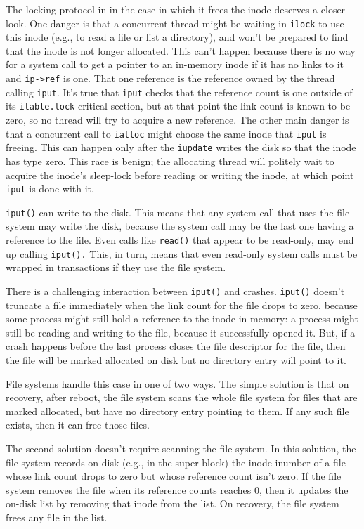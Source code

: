 The locking protocol in 
in the case in which it frees the inode deserves a closer look.
One danger is that a concurrent thread might be waiting in
\lstinline{ilock}
to use this inode (e.g., to read a file or list a directory),
and won't be prepared to find that the inode is not longer
allocated. This can't happen because there is no way for
a system call to get a pointer to an in-memory inode if it has
no links to it and 
\lstinline{ip->ref}
is one. That one reference is the reference owned by the
thread calling
\lstinline{iput}.
It's true that 
\lstinline{iput}
checks that the reference count is one outside of its
\lstinline{itable.lock}
critical section, but at that point the link
count is known to be zero, so no thread will try
to acquire a new reference.
The other main danger is that a concurrent call to
\lstinline{ialloc}
might choose the same inode that
\lstinline{iput}
is freeing.
This can happen only after the
\lstinline{iupdate}
writes the disk so that the inode has type zero.
This race is benign; the allocating thread will politely wait
to acquire the inode's sleep-lock before reading or writing
the inode, at which point
\lstinline{iput}
is done with it.

\lstinline{iput()}
can write to the disk.  This means that any system call that uses the file
system may write the disk, because the system call may be the last one having a
reference to the file. Even calls like
\lstinline{read()}
that appear to be read-only, may end up calling
\lstinline{iput().}
This, in turn, means that even read-only system calls
must be wrapped in transactions if they use the file system.

There is a challenging interaction between
\lstinline{iput()}
and crashes.
\lstinline{iput()}
doesn't truncate a file immediately when the link count for the file
drops to zero, because some process might still hold a reference to the inode in
memory: a process might still be reading and writing to the file, because it
successfully opened it. But, if a crash happens before the last process closes
the file descriptor for the file, then the file will be marked allocated on disk
but no directory entry will point to it.

File systems handle this case in one of two ways. The simple solution is that on
recovery, after reboot, the file system scans the whole file system for files
that are marked allocated, but have no directory entry pointing to them.  If any
such file exists, then it can free those files.

The second solution doesn't require scanning the file system.  In this solution,
the file system records on disk (e.g., in the super block) the inode inumber of
a file whose link count drops to zero but whose reference count isn't zero.  If
the file system removes the file when its reference counts reaches 0, then it
updates the on-disk list by removing that inode from the list. On recovery, the
file system frees any file in the list.

